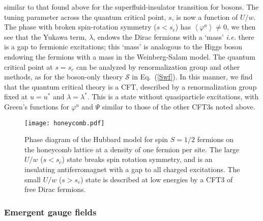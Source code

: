\documentclass[10pt, oneside]{book}
\begin{document}
\begin{doublespace}
similar to that found above for the superfluid-insulator transition for bosons. The tuning parameter across the quantum critical point, $s$, is now a function of $U/w$. The phase with broken spin-rotation symmetry ($s < s_c$) has $\left\langle \varphi^a \right\rangle \neq 0$, we then see that the Yukawa term, $\lambda$, endows the Dirac fermions with a `mass' {\em i.e.\/} there is a gap
to fermionic excitations; this `mass' is analogous to the Higgs boson endowing the fermions with a mass in the Weinberg-Salam model.  The quantum critical point at $s=s_c$ can be analyzed by renormalization group and other
methods, as for the boson-only theory $\mathcal{S}$ in Eq.~(\ref{Swf}). In this manner, we find that the 
quantum critical theory is a CFT, described by a renormalization group fixed at $u=u^\ast$ and $\lambda = \lambda^\ast$. 
This is a state without quasiparticle excitations, with Green's functions for $\varphi^a$ and $\Psi$ similar to those
of the other CFT3s noted above.

\begin{figure}
\centering
\texttt{[image: honeycomb.pdf]}
\caption{\label{fig:honeycomb} Phase diagram of the Hubbard model for spin $S=1/2$ fermions on the honeycomb lattice
at a density of one fermion per site. The large $U/w$ ($s < s_c$) state breaks spin rotation symmetry, and is an insulating
antiferromagnet with a gap to all charged excitations. The small $U/w$ ($s> s_c$) state is described at low energies by a 
CFT3 of free Dirac fermions.}
\end{figure}

\subsubsection{Emergent gauge fields}
\label{sec:emerge1}


\end{doublespace}
\end{document}
